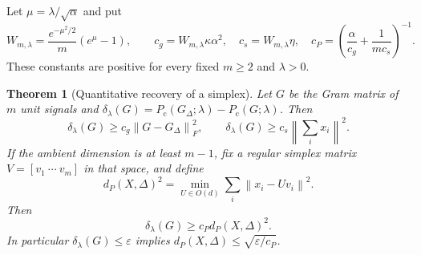 \documentclass[11pt]{article}
\newtheorem{theorem}{Theorem}
\theoremstyle{remark}\newtheorem{remark}[theorem]{Remark}
\newcommand{\norm}[1]{\left\lVert#1\right\rVert}
\newcommand{\Pc}{P_{\mathrm c}}
\begin{document}
Let $\mu=\lambda/\sqrt\alpha$ and put
\begin{equation}\label{eq:codeconstants}
 W_{m,\lambda}=\frac{e^{-\mu^2/2}}m(e^\mu-1),\qquad
 c_g=W_{m,\lambda}\kappa\alpha^2,\quad
 c_s=W_{m,\lambda}\eta,\quad
 c_P=\left(\frac\alpha{c_g}+\frac1{mc_s}\right)^{-1}.
\end{equation}
These constants are positive for every fixed $m\ge2$ and $\lambda>0$.

\begin{theorem}[Quantitative recovery of a simplex]\label{thm:code}
Let $G$ be the Gram matrix of $m$ unit signals and
$\delta_\lambda(G)=\Pc(G_\Delta;\lambda)-\Pc(G;\lambda)$. Then
\begin{equation}\label{eq:code-stability}
 \delta_\lambda(G)\ge c_g\norm{G-G_\Delta}_F^2,\qquad
 \delta_\lambda(G)\ge c_s\norm{\textstyle\sum_i x_i}^2.
\end{equation}
If the ambient dimension is at least $m-1$, fix a regular simplex matrix
$V=[v_1\ \cdots\ v_m]$ in that space, and define
\[
 d_P(X,\Delta)^2=\min_{U\in O(d)}\sum_i\norm{x_i-Uv_i}^2.
\]
Then
\begin{equation}\label{eq:procrustes-stability}
 \delta_\lambda(G)\ge c_P d_P(X,\Delta)^2.
\end{equation}
In particular $\delta_\lambda(G)\le\varepsilon$ implies
$d_P(X,\Delta)\le\sqrt{\varepsilon/c_P}$.
\end{theorem}
\end{document}
